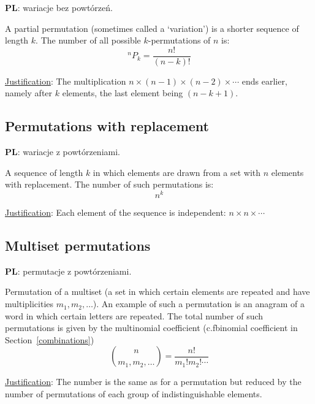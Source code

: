 \documentclass{article}
\makeatletter
\newcommand*{\cf}{c.f\@ifnextchar{.}{}{.\@\xspace}}
\newcommand{\pl}{\textbf{PL}: }
\makeatother
\begin{document}
\foreignlanguage{polish}{\pl wariacje bez powtórzeń.}

A partial permutation (sometimes called a `variation') is a shorter sequence of length $k$.
The number of all possible $k$\nobreakdash-\hspace{0pt}permutations of $n$ is:
%
\begin{equation}
    ^nP_k = \frac{n!}{(n-k)!}
\end{equation}

\underline{Justification}:
The multiplication ${n\times(n-1)\times(n-2)\times \dotsb}$ ends earlier, namely after $k$ elements, the last element being $(n-k+1)$.


\subsection{Permutations with replacement}

\foreignlanguage{polish}{\pl wariacje z powtórzeniami.}

A sequence of length $k$ in which elements are drawn from a set with $n$ elements with replacement.
The number of such permutations is:
%
\begin{equation}
    n^k
\end{equation}

\underline{Justification}:
Each element of the sequence is independent: $n\times n\times \dotsb$

\subsection{Multiset permutations}
\label{mulper}

\foreignlanguage{polish}{\pl permutacje z powtórzeniami.}

Permutation of a multiset (a set in which certain elements are repeated and have multiplicities $m_1, m_2, \dotsc$).
An example of such a permutation is an anagram of a word in which certain letters are repeated.
The total number of such permutations is given by the multinomial coefficient (\cf binomial coefficient in Section~\ref{combinations})
%
\begin{equation}
    \binom{n}{m_1, m_2, \dotsc} = \frac{n!}{m_1!m_2!\dotsm}
\end{equation}

\underline{Justification}:
The number is the same as for a permutation but reduced by the number of permutations of each group of indistinguishable elements.
\end{document}
